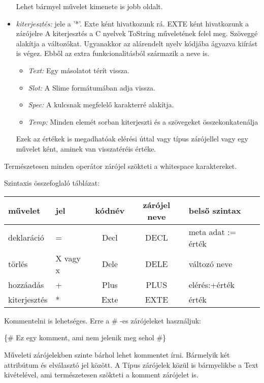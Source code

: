 \begin{itemize}
Lehet bármyel művelet kimenete is jobb oldalt.
\item \emph{kiterjesztés:}
jele a '*'.
Exte ként hivatkozunk rá.
EXTE ként hivatkozunk a zárójelre
A kiterjesztés a C nyelvek ToString műveletének felel meg. 
Szöveggé alakítja a változókat.
Ugyanakkor az alárendelt nyelv kódjába ágyazva kiírást is végez.
Ebből az extra funkcionalitásból származik a neve is.
\begin{itemize}
\item\emph{Text:} Egy másolatot térít vissza.
\item\emph{Slot:} A Slime formátumában adja vissza.
\item\emph{Spec:} A kulcsnak megfelelő karakterré alakítja.
\item\emph{Temp:} Minden elemét sorban kiterjeszti és a szövegeket összekonkatenálja
\end{itemize}
Ezek az értékek is megadhatóak elérési úttal vagy típus zárójellel vagy egy művelet ként, aminek van visszatéréis értéke.
\end{itemize}

Természetesen minden operátor zárójel szökteti a whitespace karaktereket.

Szintaxis összefoglaló táblázat:
\begin{center}
  \begin{tabular}{ | l | l | c | c | l |}
    \hline
    művelet		& jel	 	& kódnév 		& zárójel neve	& belső szintax		\\ \hline
    deklaráció	& = 		& Decl		 	& DECL			& meta adat := érték\\ \hline
    törlés		& X vagy x	& Dele		 	& DELE			& változó neve		\\ \hline
    hozzáadás	& + 		& Plus		 	& PLUS			& elérés:+érték		\\ \hline
    kiterjesztés& * 		& Exte		 	& EXTE			& érték				\\
    \hline
  \end{tabular}
\end{center}

Kommentelni is lehetséges. Erre a \# -es zárójeleket használjuk:

\{\# Ez egy komment, ami nem jelenik meg sehol \#\}

Műveleti zárójelekben szinte bárhol lehet kommentet írni.
Bármelyik két attribútum és elválasztó jel között.
A Típus zárójelek közül is bármyelikbe a Text kivételével, ami természetesen szökteti a komment zárójelet is.

